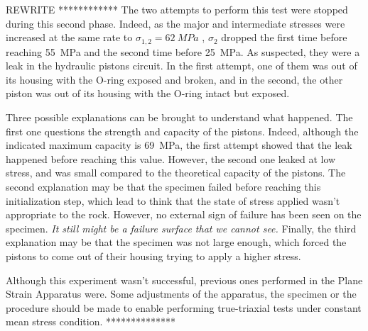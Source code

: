 REWRITE ************ The two attempts to perform this test were stopped during this second phase. Indeed, as the major and intermediate stresses were increased at the same rate to $\sigma_{1,2} = \SI{62}{MPa}$ , $\sigma_2$ dropped the first time before reaching \SI{55}{MPa} and the second time before \SI{25}{MPa}. As suspected, they were a leak in the hydraulic pistons circuit. In the first attempt, one of them was out of its housing with the O-ring exposed and broken, and in the second, the other piston was out of its housing with the O-ring intact but exposed. 

Three possible explanations can be brought to understand what happened. The first one questions the strength and capacity of the pistons. Indeed, although the indicated maximum capacity is \SI{69}{MPa}, the first attempt showed that the leak happened before reaching this value. However, the second one leaked at low stress, and was small compared to the theoretical capacity of the pistons. The second explanation may be that the specimen failed before reaching this initialization step, which lead to think that the state of stress applied wasn’t appropriate to the rock. However, no external sign of failure has been seen on the specimen. \emph{It still might be a failure surface that we cannot see.} Finally, the third explanation may be that the specimen was not large enough, which forced the pistons to come out of their housing trying to apply a higher stress.

Although this experiment wasn't successful, previous ones performed in the Plane Strain Apparatus were. Some adjustments of the apparatus, the specimen or the procedure should be made to enable performing true-triaxial tests under constant mean stress condition. **************
